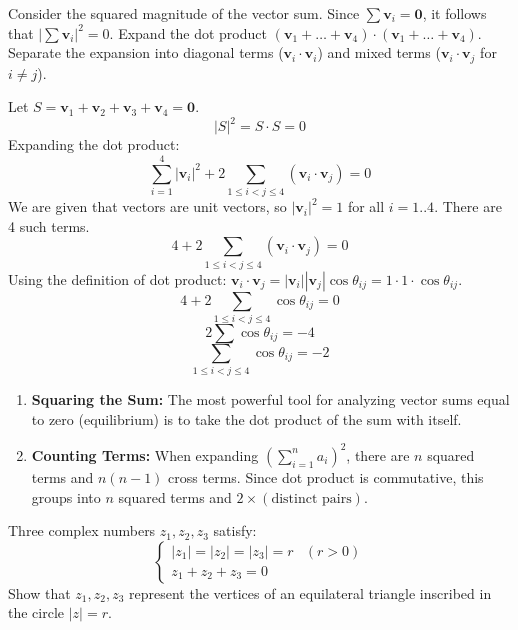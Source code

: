 \begin{hint}
Consider the squared magnitude of the vector sum.
Since $\sum \mathbf{v}_i = \mathbf{0}$, it follows that $|\sum \mathbf{v}_i|^2 = 0$.
Expand the dot product $(\mathbf{v}_1 + \dots + \mathbf{v}_4) \cdot (\mathbf{v}_1 + \dots + \mathbf{v}_4)$.
Separate the expansion into diagonal terms ($\mathbf{v}_i \cdot \mathbf{v}_i$) and mixed terms ($\mathbf{v}_i \cdot \mathbf{v}_j$ for $i \ne j$).
\end{hint}

\begin{solution}
Let $S = \mathbf{v}_1 + \mathbf{v}_2 + \mathbf{v}_3 + \mathbf{v}_4 = \mathbf{0}$.
\[ |S|^2 = S \cdot S = 0 \]
Expanding the dot product:
\[ \sum_{i=1}^4 |\mathbf{v}_i|^2 + 2 \sum_{1 \le i < j \le 4} (\mathbf{v}_i \cdot \mathbf{v}_j) = 0 \]
We are given that vectors are unit vectors, so $|\mathbf{v}_i|^2 = 1$ for all $i=1..4$.
There are 4 such terms.
\[ 4 + 2 \sum_{1 \le i < j \le 4} (\mathbf{v}_i \cdot \mathbf{v}_j) = 0 \]
Using the definition of dot product: $\mathbf{v}_i \cdot \mathbf{v}_j = |\mathbf{v}_i| |\mathbf{v}_j| \cos \theta_{ij} = 1 \cdot 1 \cdot \cos \theta_{ij}$.
\[ 4 + 2 \sum_{1 \le i < j \le 4} \cos \theta_{ij} = 0 \]
\[ 2 \sum \cos \theta_{ij} = -4 \]
\[ \sum_{1 \le i < j \le 4} \cos \theta_{ij} = -2 \]
\end{solution}

\begin{takeaways}
\begin{enumerate}
    \item \textbf{Squaring the Sum:} The most powerful tool for analyzing vector sums equal to zero (equilibrium) is to take the dot product of the sum with itself.
    \item \textbf{Counting Terms:} When expanding $(\sum_{i=1}^n a_i)^2$, there are $n$ squared terms and $n(n-1)$ cross terms. Since dot product is commutative, this groups into $n$ squared terms and $2 \times (\text{distinct pairs})$.
\end{enumerate}
\end{takeaways}

\begin{problem}
Three complex numbers $z_1, z_2, z_3$ satisfy:
\[
\begin{cases}
    |z_1| = |z_2| = |z_3| = r & (r > 0) \\
    z_1 + z_2 + z_3 = 0
\end{cases}
\]
Show that $z_1, z_2, z_3$ represent the vertices of an equilateral triangle inscribed in the circle $|z|=r$.
\end{problem}

